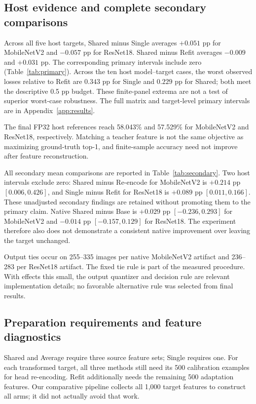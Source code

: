 \documentclass[10pt,twocolumn]{article}
\begin{document}
\subsection{Host evidence and complete secondary comparisons}
Across all five host targets, Shared minus Single averages $+0.051$ pp for MobileNetV2 and $-0.057$ pp for ResNet18. Shared minus Refit averages $-0.009$ and $+0.031$ pp. The corresponding primary intervals include zero (Table~\ref{tab:primary}). Across the ten host model--target cases, the worst observed losses relative to Refit are $0.343$ pp for Single and $0.229$ pp for Shared; both meet the descriptive 0.5 pp budget. These finite-panel extrema are not a test of superior worst-case robustness. The full matrix and target-level primary intervals are in Appendix~\ref{app:results}.

The final FP32 host references reach 58.043\% and 57.529\% for MobileNetV2 and ResNet18, respectively. Matching a teacher feature is not the same objective as maximizing ground-truth top-1, and finite-sample accuracy need not improve after feature reconstruction.

All secondary mean comparisons are reported in Table~\ref{tab:secondary}. Two host intervals exclude zero: Shared minus Re-encode for MobileNetV2 is $+0.214$ pp $[0.006,0.426]$, and Single minus Refit for ResNet18 is $+0.089$ pp $[0.011,0.166]$. These unadjusted secondary findings are retained without promoting them to the primary claim. Native Shared minus Base is $+0.029$ pp $[-0.236,0.293]$ for MobileNetV2 and $-0.014$ pp $[-0.157,0.129]$ for ResNet18. The experiment therefore also does not demonstrate a consistent native improvement over leaving the target unchanged.

Output ties occur on 255--335 images per native MobileNetV2 artifact and 236--283 per ResNet18 artifact. The fixed tie rule is part of the measured procedure. With effects this small, the output quantizer and decision rule are relevant implementation details; no favorable alternative rule was selected from final results.

\subsection{Preparation requirements and feature diagnostics}
Shared and Average require three source feature sets; Single requires one. For each transformed target, all three methods still need its 500 calibration examples for head re-encoding. Refit additionally needs the remaining 500 adaptation features. Our comparative pipeline collects all 1,000 target features to construct all arms; it did not actually avoid that work.
\end{document}
